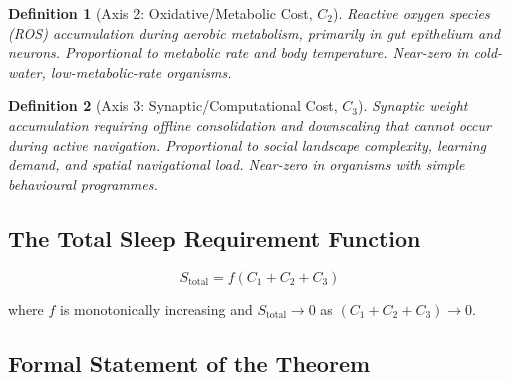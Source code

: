 \documentclass[12pt, a4paper]{article}
\newtheorem{definition}{Definition}
\begin{document}
\begin{definition}[Axis 2: Oxidative/Metabolic Cost, $C_2$]
Reactive oxygen species (ROS) accumulation during aerobic
metabolism, primarily in gut epithelium and neurons.
Proportional to metabolic rate and body temperature.
Near-zero in cold-water, low-metabolic-rate organisms.
\end{definition}

\begin{definition}[Axis 3: Synaptic/Computational Cost, $C_3$]
Synaptic weight accumulation requiring offline consolidation
and downscaling that cannot occur during active navigation.
Proportional to social landscape complexity, learning demand,
and spatial navigational load. Near-zero in organisms with
simple behavioural programmes.
\end{definition}

\subsection{The Total Sleep Requirement Function}

\begin{equation}
    S_{\text{total}} = f(C_1 + C_2 + C_3)
    \label{eq:sleep}
\end{equation}

where $f$ is monotonically increasing and $S_{\text{total}}
\rightarrow 0$ as $(C_1 + C_2 + C_3) \rightarrow 0$.

\subsection{Formal Statement of the Theorem}
\end{document}
